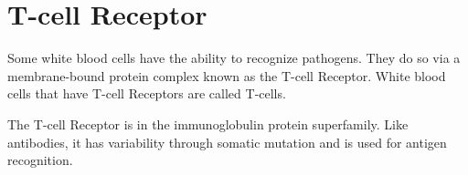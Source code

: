 \section{T-cell Receptor}
\label{Glossary:T_cell_receptor}
Some white blood cells have the ability to recognize pathogens.  They do so via
a membrane-bound protein complex known as the T-cell Receptor.  White blood cells
that have T-cell Receptors are called T-cells.

The T-cell Receptor is in the immunoglobulin protein superfamily.  Like antibodies,
it has variability through somatic mutation and is used for antigen recognition.
